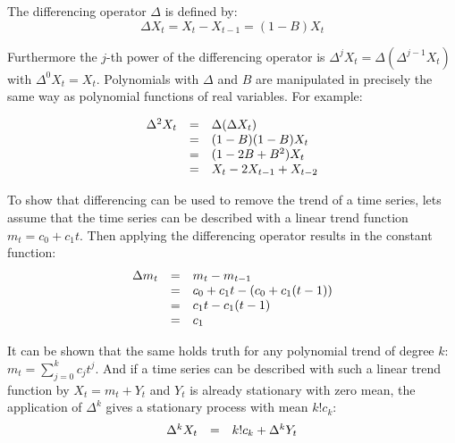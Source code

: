 \begin{definition}\label{def:differncing}
    The differencing operator $\Delta$ is defined by:
    \begin{equation}\label{eq:first_difference}
        \Delta X_t = X_t - X_{t-1} = (1-B)X_t
    \end{equation}
\end{definition}

Furthermore the $j$-th power of the differencing operator is $\Delta^j X_t = \Delta (\Delta^{j-1} X_t)$ with \(\Delta^0 X_t = X_t\). Polynomials with \(\Delta\) and $B$ are manipulated in precisely the same way as polynomial functions of real variables.\textsuperscript{\cite[p.~29]{Brockwell2002Introduction2nd}} For example:

\begin{equation}\label{eq:example_delta_squared}
    \begin{array}[c]{lcl}
        \Delta^2 X_t &=& \Delta (\Delta X_t) \\
        &=& (1-B)(1-B)X_t \\
        &=& (1-2B + B^2) X_t \\
        &=& X_t - 2 X_{t-1} +  X_{t-2}
    \end{array}
\end{equation}

To show that differencing can be used to remove the trend of a time series, lets assume that the time series can be described with a linear trend function $m_t=c_0 + c_1 t$. Then applying the differencing operator results in the constant function:
\begin{equation}\label{eq:example_differnce_linear_trend}
    \begin{array}[c]{lcl}
        \Delta m_t &=& m_t - m_{t-1} \\
        &=& c_0 + c_1 t - (c_0 + c_1 (t-1)) \\
        &=& c_1 t - c_1 (t-1)\\
        &=& c_1
    \end{array}
\end{equation}

It can be shown that the same holds truth for any polynomial trend of degree $k$: $m_t=\sum_{j=0}^{k}c_j t^j$. And if a time series can be described with such a linear trend function by $X_t = m_t + Y_t$ and $Y_t$ is already stationary with zero mean, the application of $\Delta^k$ gives a stationary process with mean $k!c_k$: 
\begin{equation}\label{eq:example_differnce_ts_polynomial_trend}
    \begin{array}[c]{lcl}
        \Delta^k X_t&=& k!c_k + \Delta^k Y_t
    \end{array}
\end{equation}

